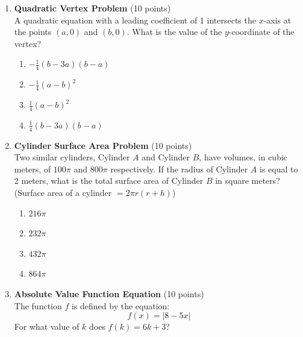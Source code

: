 \begin{enumerate}
  \newpage


  \item \textbf{Quadratic Vertex Problem} (10 points)\\
  A quadratic equation with a leading coefficient of 1 intersects the $x$-axis at the points $(a, 0)$ and $(b, 0)$. What is the value of the $y$-coordinate of the vertex?
  \begin{enumerate}[label=(\Alph*)]
    \item $-\frac{1}{4}(b-3 a)(b-a)$
    \item $-\frac{1}{4}(a-b)^2$
    \item $\frac{1}{4}(a-b)^2$
    \item $\frac{1}{4}(b-3 a)(b-a)$
  \end{enumerate}
  \begin{subanswer}
  \end{subanswer}


  \item \textbf{Cylinder Surface Area Problem} (10 points)\\
  Two similar cylinders, Cylinder $A$ and Cylinder $B$, have volumes, in cubic meters, of $100 \pi$ and $800 \pi$ respectively. If the radius of Cylinder $A$ is equal to 2 meters, what is the total surface area of Cylinder $B$ in square meters? (Surface area of a cylinder $=2 \pi r(r+h)$)
  \begin{enumerate}[label=(\Alph*)]
    \item $216 \pi$
    \item $232 \pi$
    \item $432 \pi$
    \item $864 \pi$
  \end{enumerate}
  \begin{subanswer}
  \end{subanswer}
  









  \item \textbf{Absolute Value Function Equation} (10 points)\\
  The function $f$ is defined by the equation:
  \[
    f(x) = |8 - 5x|
  \]
  For what value of $k$ does $f(k) = 6k + 3$?
  \begin{subanswer}
  \end{subanswer}





\end{enumerate}
